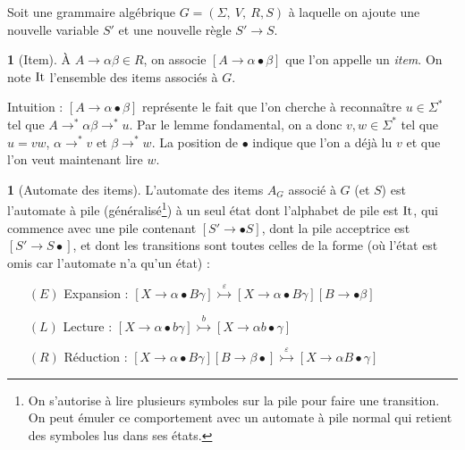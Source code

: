 \documentclass[10pt,a4paper,notitlepage]{article}
\theoremstyle{plain}
\theoremstyle{definition}
\newtheorem{defn}[thm]{\protect\definitionname}
\theoremstyle{definition}
\theoremstyle{remark}
\theoremstyle{remark}
\theoremstyle{plain}
\theoremstyle{plain}
\theoremstyle{plain}
\theoremstyle{remark}
\providecommand{\definitionname}{Définition}
\begin{document}
Soit une grammaire algébrique $G=\left(\Sigma,\ V,\ R, S\right)$ à
laquelle on ajoute une nouvelle variable $S'$ et une nouvelle règle
$S'\to S$.

\begin{defn}[Item]
À $A\to\alpha\beta\in R$, on associe $\left[A\to\alpha\bullet\beta\right]$
que l'on appelle un \emph{item}. On note $\operatorname{It}$ l'ensemble des items associés
à $G$.
\end{defn}

Intuition : $\left[A\to\alpha\bullet\beta\right]$ représente le fait
que l'on cherche à reconnaître $u\in\Sigma^{*}$ tel que $A\to^{*}\alpha\beta\to^{*}u$.
Par le lemme fondamental, on a donc $v,w\in\Sigma^{*}$ tel que $u=vw$,
$\alpha\to^{*}v$ et $\beta\to^{*}w$. La position de $\bullet$ indique
que l'on a déjà lu $v$ et que l'on veut maintenant lire $w$.
\begin{defn}[Automate des items]
	
	L'automate des items $A_{G}$ associé à $G$ (et $S$) est l'automate
	à pile (généralisé\footnote{On s'autorise à lire plusieurs symboles sur la pile pour faire une transition. On peut émuler ce comportement avec un automate à pile normal qui retient des symboles lus dans ses états.}) à un seul état dont l'alphabet de pile est $\operatorname{It}$,
	qui commence avec une pile contenant $\left[S'\to\bullet S\right]$,
	dont la pile \og acceptrice \fg{} est $\left[S'\to S\bullet\right]$,
	et dont les transitions sont toutes celles de la forme (où l'état
	est omis car l'automate n'a qu'un état) :
	\begin{itemize}
		\item[$(E)$]  \og Expansion \fg{} : $\left[X\to\alpha\bullet B\gamma\right]\overset{\varepsilon}{\rightarrowtail}\left[X\to\alpha\bullet B\gamma\right]\left[B\to\bullet\beta\right]$
		\item[$(L)$]  \og Lecture \fg{} : $\left[X\to\alpha\bullet b\gamma\right]\overset{b}{\rightarrowtail}\left[X\to\alpha b\bullet\gamma\right]$
		\item[$(R)$]  \og Réduction \fg{} : $\left[X\to\alpha\bullet B\gamma\right]\left[B\to\beta\bullet\right]\overset{\varepsilon}{\rightarrowtail}\left[X\to\alpha B\bullet\gamma\right]$ 
	\end{itemize}
\end{defn}
\end{document}
